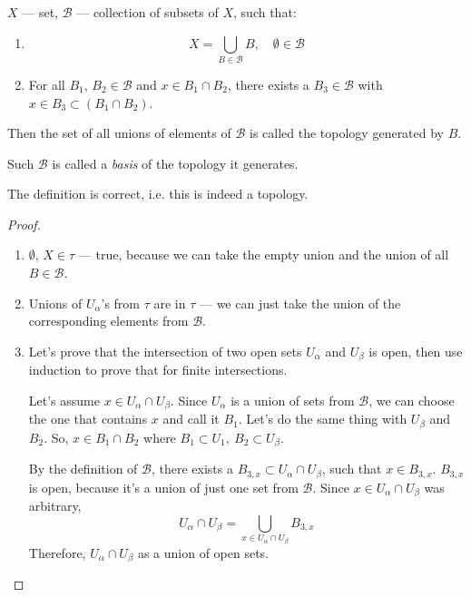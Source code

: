 \begin{definition}[Basis]
    $X$ --- set, $\mathcal{B}$ --- collection of subsets of $X$, such that:
    \begin{enumerate}
        \item {
            \[ X = \bigcup_{B \in \mathcal{B}} B, \quad \emptyset \in \mathcal{B} \]
        }
        \item {
            For all $B_1,\, B_2 \in \mathcal{B}$ and
            $x \in B_1 \cap B_2$, there exists a $B_3 \in \mathcal{B}$ with 
            $x \in B_3 \subset (B_1 \cap B_2)$.
        }
    \end{enumerate}
    Then the set of all unions of elements of $\mathcal{B}$ is called the topology 
    generated by $B$.

    Such $\mathcal{B}$ is called a \textit{basis} of the topology it generates.
\end{definition}
\begin{proposition}
    The definition is correct, i.e. this is indeed a topology.
\end{proposition}
\begin{proof}
    \begin{enumerate}
        \item {
            $\emptyset,\, X \in \tau$ --- true, because we can
            take the empty union and the union of all $B \in \mathcal{B}$.
        }
        \item {
            Unions of $U_\alpha$'s from $\tau$ are in $\tau$ --- we can 
            just take the union of the corresponding elements from $\mathcal{B}$.
        }
        \item {
            Let's prove that the intersection of two open sets $U_\alpha$ and $U_\beta$
            is open, then use induction to prove that for finite intersections.

            Let's assume $x \in U_\alpha \cap U_\beta$.
            Since $U_\alpha$ is a union of sets from $\mathcal{B}$, we can 
            choose the one that contains $x$ and call it $B_1$. Let's do the same thing with
            $U_\beta$ and $B_2$. So,
            $x \in B_1 \cap B_2$ where $B_1 \subset U_1,\ B_2 \subset U_\beta$.

            By the definition of $\mathcal{B}$, there exists a
            $B_{3,x} \subset U_\alpha \cap U_\beta$, such that $x \in B_{3,x}$.
            $B_{3,x}$ is open, because it's a union of just one set from $\mathcal{B}$.
            Since $x \in U_\alpha \cap U_\beta$ was arbitrary,
            \[
                U_\alpha \cap U_\beta = \bigcup_{x \in U_\alpha \cap U_\beta} B_{3, x}
            \]
            Therefore, $U_\alpha \cap U_\beta$ as a union of open sets. 
        }
    \end{enumerate}
\end{proof}

